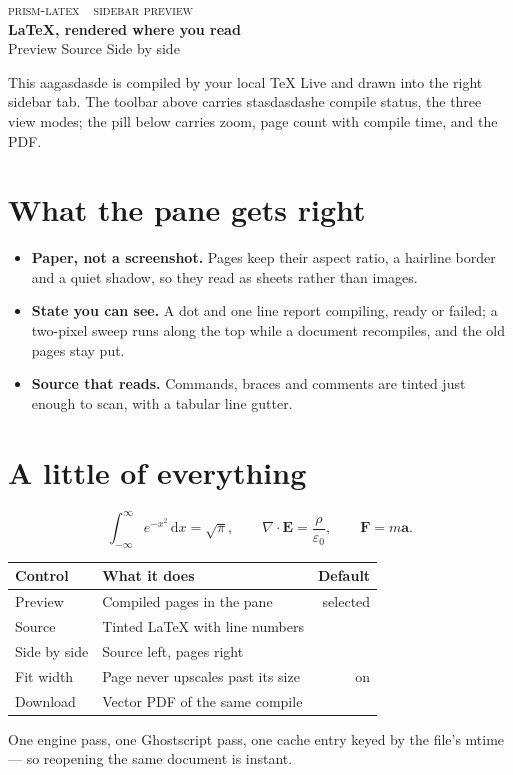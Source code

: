\documentclass[11pt]{article}
\begin{document}
\begin{flushleft}
  {\color{muted}\small\scshape prism-latex \,\textperiodcentered\, sidebar preview}\\[0.5em]
  {\Huge\bfseries\color{ink} LaTeX, rendered where you read}\\[0.35em]
  {\large\color{accent} Preview \textperiodcentered{} Source \textperiodcentered{} Side by side}
\end{flushleft}

\vspace{0.4em}

\noindent
This aagasdasde is compiled by your local TeX Live and drawn into the right sidebar tab. The toolbar
above carries stasdasdashe compile status, the three view modes; the pill below carries zoom, page count
with compile time, and the PDF.

\section{What the pane gets right}

\begin{itemize}\setlength{\itemsep}{2pt}
  \item \textbf{Paper, not a screenshot.} Pages keep their aspect ratio, a hairline border and a
        quiet shadow, so they read as sheets rather than images.
  \item \textbf{State you can see.} A dot and one line report compiling, ready or failed; a
        two-pixel sweep runs along the top while a document recompiles, and the old pages stay put.
  \item \textbf{Source that reads.} Commands, braces and comments are tinted just enough to scan,
        with a tabular line gutter.
\end{itemize}

\section{A little of everything}

\[
  \int_{-\infty}^{\infty} e^{-x^{2}}\,\mathrm{d}x = \sqrt{\pi},
  \qquad
  \nabla \cdot \mathbf{E} = \frac{\rho}{\varepsilon_{0}},
  \qquad
  \mathbf{F} = m\mathbf{a}.
\]

\begin{center}
\renewcommand{\arraystretch}{1.25}
\begin{tabular}{@{}llr@{}}
  \toprule
  \textbf{Control} & \textbf{What it does} & \textbf{Default} \\
  \midrule
  Preview & Compiled pages in the pane & \color{accent}selected \\
  Source & Tinted \LaTeX{} with line numbers & \\
  Side by side & Source left, pages right & \\
  Fit width & Page never upscales past its size & \color{accent}on \\
  Download & Vector PDF of the same compile & \\
  \bottomrule
\end{tabular}
\end{center}

\vspace{0.3em}
{\color{muted}\small One engine pass, one Ghostscript pass, one cache entry keyed by the file's
mtime --- so reopening the same document is instant.}
\end{document}

